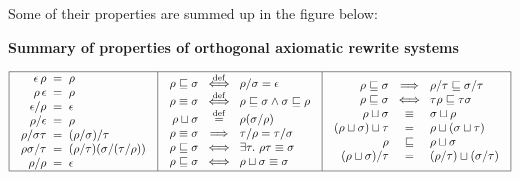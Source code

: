 Some of their properties are summed up in the figure
below:
\begin{center}
{\bf Summary of properties of orthogonal axiomatic rewrite systems}
\end{center}
{\footnotesize
\[
\begin{array}{|c|c|c|}
\hline
\begin{array}{r@{\hspace{0.2cm}}c@{\hspace{0.2cm}}l}
  \emptyDerivation\,\redseq & = & \redseq
\\
  \redseq\,\emptyDerivation & = & \redseq
\\
  \emptyDerivation/\redseq & = & \emptyDerivation
\\
  \redseq/\emptyDerivation & = & \redseq
\\
  \redseq/\redseqtwo\redseqthree & = & (\redseq/\redseqtwo)/\redseqthree
\\
  \redseq\redseqtwo/\redseqthree & = & (\redseq/\redseqthree)(\redseqtwo/(\redseqthree/\redseq))
\\
  \redseq/\redseq & = & \emptyDerivation
\end{array}
&
\begin{array}{r@{\hspace{0.2cm}}c@{\hspace{0.2cm}}l}
  \redseq \permle \redseqtwo & \iffdef & \redseq/\redseqtwo = \emptyDerivation
\\
  \redseq \permeq \redseqtwo & \iffdef & \redseq \permle \redseqtwo \land \redseqtwo \permle \redseq
\\
  \redseq \sqcup \redseqtwo  & \eqdef & \redseq(\redseqtwo/\redseq) 
\\
  \redseq \permeq \redseqtwo & \implies & \redseqthree/\redseq = \redseqthree/\redseqtwo
\\
  \redseq \permle \redseqtwo & \iff & \exists \redseqthree.\ \redseq\redseqthree \permeq \redseqtwo
\\
  \redseq \permle \redseqtwo & \iff & \redseq \sqcup \redseqtwo \permeq \redseqtwo
\end{array}
&
\begin{array}{r@{\hspace{0.2cm}}c@{\hspace{0.2cm}}l}
  \redseq \permle \redseqtwo & \implies & \redseq/\redseqthree \permle \redseqtwo/\redseqthree
\\
  \redseq \permle \redseqtwo & \iff & \redseqthree\redseq \permle \redseqthree\redseqtwo
\\
  \redseq \sqcup \redseqtwo  & \permeq & \redseqtwo \sqcup \redseq
\\
  (\redseq \sqcup \redseqtwo) \sqcup \redseqthree & = & \redseq \sqcup (\redseqtwo \sqcup \redseqthree)
\\
  \redseq & \permle & \redseq \sqcup \redseqtwo
\\
  (\redseq \sqcup \redseqtwo)/\redseqthree & = & (\redseq/\redseqthree) \sqcup (\redseqtwo/\redseqthree) \\
\end{array}
\\
\hline
\end{array}
\]
}
